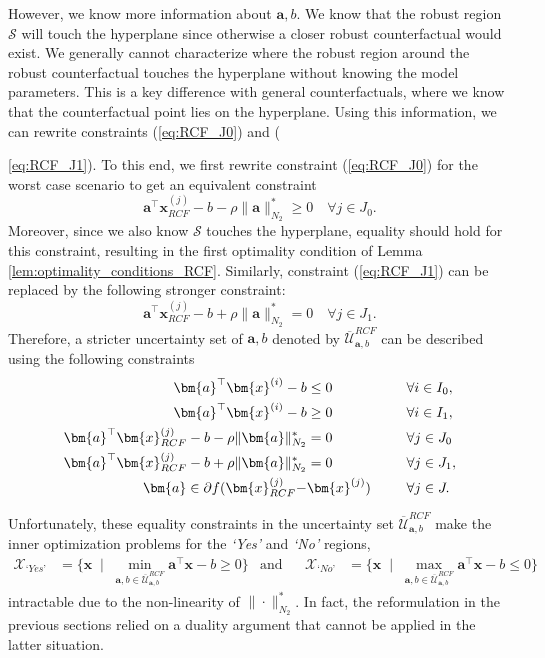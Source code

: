 \documentclass{article}
\begin{document}
However, we know more information about $\bm{a},b$. We know that the robust region $\mathcal{S}$ will touch the hyperplane since otherwise a closer robust counterfactual would exist. We generally cannot characterize where the robust region around the robust counterfactual touches the hyperplane without knowing the model parameters. This is a key difference with general counterfactuals, where we know that the counterfactual point lies on the hyperplane. Using this information, we can rewrite constraints (\ref{eq:RCF_J0}) and ({\ref{eq:RCF_J1}). To this end, we first rewrite constraint (\ref{eq:RCF_J0}) for the worst case scenario to get an equivalent constraint
\[\bm{a}^{\top}\bm{x}_{RCF}^{(j)} -b-\rho\|\bm{a}\|_{N_2}^*\geq 0 \quad\forall j \in J_{0}.\]
Moreover, since we also know $\mathcal{S}$ touches the hyperplane, equality should hold for this constraint, resulting in the first optimality condition of Lemma \ref{lem:optimality_conditions_RCF}. Similarly, constraint (\ref{eq:RCF_J1}) can be replaced by the following stronger constraint:
\[\bm{a}^{\top}\bm{x}_{RCF}^{(j)} -b+\rho\|\bm{a}\|_{N_2}^*= 0 \quad\forall j \in J_1.\]
Therefore, a stricter uncertainty set of $\bm{a},b$ denoted by $\overline{\mathcal{U}}_{\bm{a},b}^{RCF}$ can be described using the following constraints
\begin{align*}
  \bm{a}^{\top}\bm{x}^{(i)} -b&\leq 0  &&\quad \forall i \in I_{0}, \notag\\
  \bm{a}^{\top}\bm{x}^{(i)} -b&\geq 0  &&\quad \forall i \in I_1, \notag \\ 
  \bm{a}^{\top}\bm{x}_{RCF}^{(j)} -b-\rho\|\bm{a}\|_{N_2}^*&= 0 &&\quad\forall j \in J_0\\
  \bm{a}^{\top}\bm{x}_{RCF}^{(j)} -b+\rho\|\bm{a}\|_{N_2}^*&= 0 &&\quad\forall j \in J_1,\\
   \bm{a}\in\partial  f(\bm{x}_{RCF}^{(j)} -& \bm{x}^{(j)}) \;\;&&\quad\forall j \in J.
\end{align*} 

Unfortunately, these equality constraints in the uncertainty set $\overline{\mathcal{U}}_{\bm{a},b}^{RCF}$ make the inner optimization problems for the \textit{`Yes'} and \textit{`No'} regions,
\begin{align*}
    \mathcal{X}_{\textit{`Yes'}}&=\{ \bm{x}  \;\; | \;\;  \min_{\bm{a},b\in \overline{\mathcal{U}}_{\bm{a},b}^{RCF}}\bm{a}^{\top}\bm{x} - b \geq 0  \}&\text{and}&&
  \mathcal{X}_{\textit{`No'}}&=\{ \bm{x}  \;\; | \;\;  \max_{\bm{a},b\in \overline{\mathcal{U}}_{\bm{a},b}^{RCF}}\bm{a}^{\top}\bm{x} - b \leq 0  \}
\end{align*}
 intractable due to the non-linearity of $\|\cdot\|_{N_2}^*$. In fact, the reformulation in the previous sections relied on a duality argument that cannot be applied in the latter situation.

}
\end{document}
